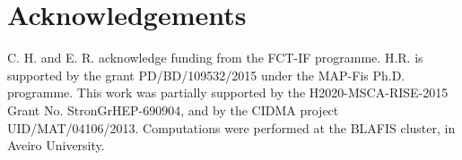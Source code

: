 \documentclass{article}
\begin{document}
\section*{Acknowledgements}
C. H. and E. R. acknowledge funding from the FCT-IF programme. H.R. is supported by the grant PD/BD/109532/2015 under the MAP-Fis Ph.D. programme. This  work  was  partially  supported  by  the  H2020-MSCA-RISE-2015  Grant  No. StronGrHEP-690904,  and  by  the  CIDMA  project  UID/MAT/04106/2013.  Computations were performed at the BLAFIS cluster, in Aveiro University.

\bigskip












\end{document}
